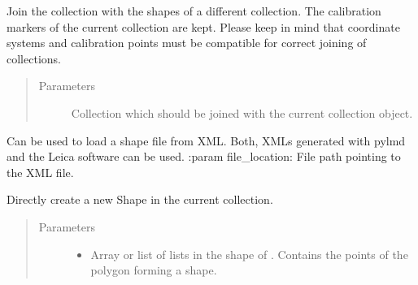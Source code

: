 \documentclass[letterpaper,10pt,english,openany,oneside]{sphinxmanual}
\begin{document}
\begin{fulllineitems}
\begin{fulllineitems}
\label{\detokenize{pages/modules:lmd.lib.Collection.join}}
\sphinxAtStartPar
Join the collection with the shapes of a different collection. The calibration markers of the current collection are kept. Please keep in mind that coordinate systems and calibration points must be compatible for correct joining of collections.
\begin{quote}\begin{description}
\item[{Parameters}] \leavevmode
\sphinxAtStartPar
{} \textendash{} Collection which should be joined with the current collection object.

\end{description}\end{quote}

\end{fulllineitems}


\begin{fulllineitems}
\label{\detokenize{pages/modules:lmd.lib.Collection.load}}
\sphinxAtStartPar
Can be used to load a shape file from XML. Both, XMLs generated with py\sphinxhyphen{}lmd and the Leica software can be used.
:param file\_location: File path pointing to the XML file.

\end{fulllineitems}


\begin{fulllineitems}
\label{\detokenize{pages/modules:lmd.lib.Collection.new_shape}}
\sphinxAtStartPar
Directly create a new Shape in the current collection.
\begin{quote}\begin{description}
\item[{Parameters}] \leavevmode\begin{itemize}
\item {} 
\sphinxAtStartPar
{} \textendash{} Array or list of lists in the shape of . Contains the points of the polygon forming a shape.


\end{itemize}
\end{description}
\end{quote}
\end{fulllineitems}
\end{fulllineitems}
\end{document}
